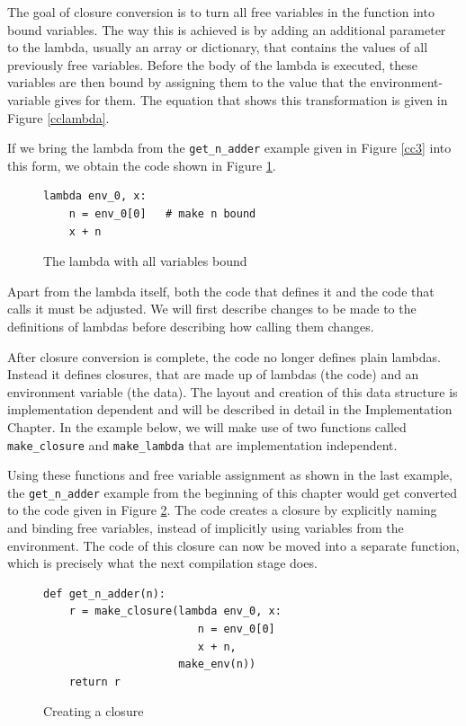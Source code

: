\documentclass[11pt]{report}
\begin{document}
The goal of closure conversion is to turn all free variables in the function into bound variables. The way this is achieved is by adding an additional parameter to the lambda, usually an array or dictionary, that contains the values of all previously free variables. Before the body of the lambda is executed, these variables are then bound by assigning them to the value that the environment-variable gives for them. The equation that shows this transformation is given in Figure \ref{cclambda}.

If we bring the lambda from the \texttt{get_n_adder} example given in Figure \ref{cc3} into this form, we obtain the code shown in Figure \ref{cc5}.

\begin{figure}[ht]
\begin{lstlisting}
lambda env_0, x: 
    n = env_0[0]   # make n bound
    x + n
\end{lstlisting}
\caption{The lambda with all variables bound}
\label{cc5}
\end{figure}

Apart from the lambda itself, both the code that defines it and the code that calls it must be adjusted. We will first describe changes to be made to the definitions of lambdas before describing how calling them changes.

After closure conversion is complete, the code no longer defines plain lambdas. Instead it defines closures, that are made up of lambdas (the code) and an environment variable (the data). The layout and creation of this data structure is implementation dependent and will be described in detail in the Implementation Chapter. In the example below, we will make use of two functions called \texttt{make_closure} and \texttt{make_lambda} that are implementation independent.

Using these functions and free variable assignment as shown in the last example, the \texttt{get_n_adder} example from the beginning of this chapter would get converted to the code given in Figure \ref{cc6}. The code creates a closure by explicitly naming and binding free variables, instead of implicitly using variables from the environment. The code of this closure can now be moved into a separate function, which is precisely what the next compilation stage does.

\begin{figure}[ht]
\begin{lstlisting}
def get_n_adder(n):
    r = make_closure(lambda env_0, x: 
                        n = env_0[0]
                        x + n, 
                     make_env(n))
    return r
\end{lstlisting}
\caption{Creating a closure}
\label{cc6}
\end{figure}
\end{document}
